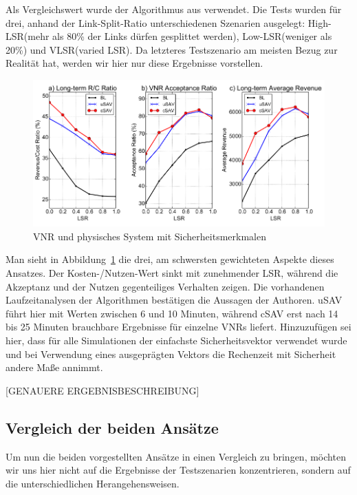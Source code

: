 \documentclass{lni}
\begin{document}
Als Vergleichswert wurde der Algorithmus aus \cite{comp} verwendet. Die Tests wurden für drei, anhand der Link-Split-Ratio unterschiedenen Szenarien ausgelegt: 
High-LSR(mehr als 80\% der Links dürfen gesplittet werden),
Low-LSR(weniger als 20\%) und VLSR(varied LSR). Da letzteres Testszenario am meisten Bezug zur Realität hat, werden wir hier nur diese Ergebnisse vorstellen. 

\begin{figure}[htb]
\begin{center}
	\includegraphics[width=1\textwidth]{perf_algo2.pdf}\newline
	\caption{\label{graph12} VNR und physisches System mit Sicherheitsmerkmalen\cite{algo2}}
\end{center}
\end{figure}

Man sieht in Abbildung~\ref{graph12} die drei, am schwersten gewichteten Aspekte dieses Ansatzes. Der Kosten-/Nutzen-Wert sinkt mit zunehmender LSR, während die Akzeptanz und der Nutzen gegenteiliges Verhalten zeigen. Die vorhandenen Laufzeitanalysen der Algorithmen bestätigen die Aussagen der Authoren. uSAV führt hier mit Werten zwischen 6 und 10 Minuten, während cSAV erst nach 14 bis 25 Minuten brauchbare Ergebnisse für einzelne VNRs liefert. Hinzuzufügen sei hier, dass für alle Simulationen der einfachste Sicherheitsvektor verwendet wurde und bei Verwendung eines ausgeprägten Vektors die Rechenzeit mit Sicherheit andere Maße annimmt.

[GENAUERE ERGEBNISBESCHREIBUNG]

\subsection{Vergleich der beiden Ansätze}
\label{subsec:svne_vergleich}

Um nun die beiden vorgestellten Ansätze in einen Vergleich zu bringen, möchten wir uns hier nicht auf die Ergebnisse der Testszenarien konzentrieren, sondern auf die unterschiedlichen Herangehensweisen.
\end{document}
